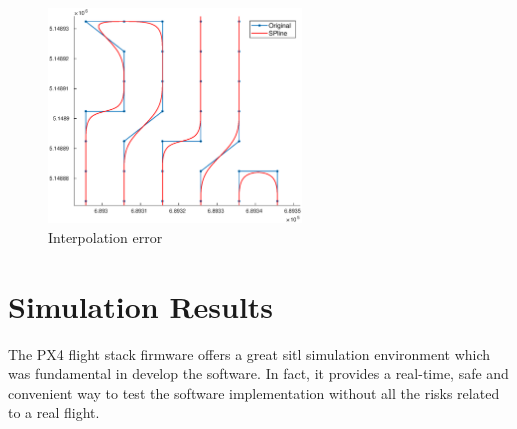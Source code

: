 \begin{figure}[ht]
    \centering
    \includegraphics[width=0.6\textwidth]{figures/C3/Interpolation-error.eps}
    \caption{Interpolation error}
    \label{fig:interpolation-error}
\end{figure}









\section{Simulation Results} %
\label{sec:simulation_results}
The PX4 flight stack firmware offers a great \acrfull{sitl} simulation environment which was fundamental in develop the software. In fact, it provides a real-time, safe and convenient way to test the software implementation without all the risks related to a real flight. \\

